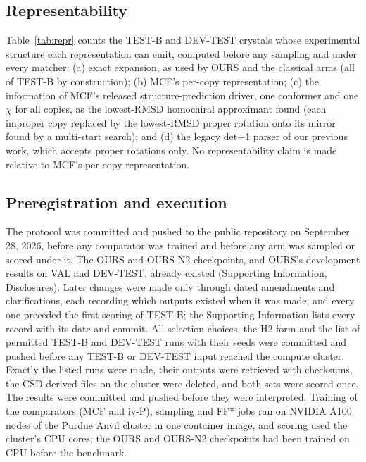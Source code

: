 \subsection{Representability}

Table~\ref{tab:repr} counts the TEST-B and DEV-TEST crystals whose
experimental structure each
representation can emit, computed before any sampling and under every matcher: (a)
exact expansion, as used by OURS and the classical arms (all of TEST-B by
construction); (b) MCF's per-copy representation; (c) the information of MCF's
released structure-prediction driver, one conformer and one $\chi$ for all copies,
as the lowest-RMSD homochiral approximant found (each improper copy replaced by the
lowest-RMSD proper rotation onto its mirror found by a multi-start search); and (d) the
legacy det+1 parser of our previous work, which accepts proper rotations only. No
representability claim is made relative to MCF's per-copy representation.

\subsection{Preregistration and execution}

The protocol was committed and pushed to the public repository\cite{cai2026symmcflow}
on September 28, 2026, before any comparator was trained and before any arm was sampled or
scored under it. The OURS and OURS-N2 checkpoints, and OURS's development results on VAL and
DEV-TEST, already existed (Supporting Information, Disclosures).
Later changes were made only through dated amendments and clarifications, each recording
which outputs existed when it was made, and every one preceded the first scoring of TEST-B;
the Supporting Information lists every record with its date and commit. All selection choices, the H2 form and the list of permitted TEST-B and DEV-TEST
runs with their seeds were committed and pushed before any TEST-B or DEV-TEST input reached
the compute cluster. Exactly the listed runs were made, their outputs were retrieved with
checksums, the CSD-derived files on the cluster were deleted, and both sets were scored
once. The results were committed and pushed before they were interpreted. Training of
the comparators (MCF and iv-P), sampling and FF* jobs ran on NVIDIA A100 nodes of the
Purdue Anvil cluster\cite{song2022anvil} in one container image, and
scoring used the cluster's CPU cores; the OURS and OURS-N2 checkpoints had been trained on
CPU before the benchmark.

